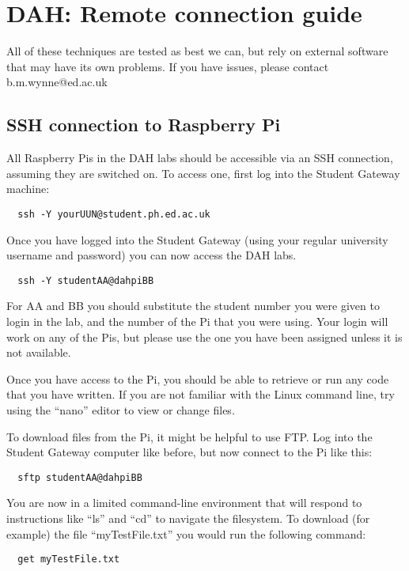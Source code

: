 \chapter{DAH: Remote connection guide}
\label{sec:remote}

All of these techniques are tested as best we can, but rely on external software that may have its own problems.
If you have issues, please contact b.m.wynne@ed.ac.uk

\section{SSH connection to Raspberry Pi}

All Raspberry Pis in the DAH labs should be accessible via an SSH connection, assuming they are switched on.
To access one, first log into the Student Gateway machine:
\begin{verbatim}
  ssh -Y yourUUN@student.ph.ed.ac.uk
\end{verbatim}

Once you have logged into the Student Gateway (using your regular university username and password) you can now access the DAH labs.
\begin{verbatim}
  ssh -Y studentAA@dahpiBB
\end{verbatim}

For AA and BB you should substitute the student number you were given to login in the lab, and the number of the Pi that you were using.
Your login will work on any of the Pis, but please use the one you have been assigned unless it is not available.

Once you have access to the Pi, you should be able to retrieve or run any code that you have written.
If you are not familiar with the Linux command line, try using the ``nano'' editor to view or change files.

\pagebreak

To download files from the Pi, it might be helpful to use FTP.
Log into the Student Gateway computer like before, but now connect to the Pi like this:
\begin{verbatim}
  sftp studentAA@dahpiBB
\end{verbatim}

You are now in a limited command-line environment that will respond to instructions like ``ls'' and ``cd'' to navigate the filesystem.
To download (for example) the file ``myTestFile.txt'' you would run the following command:
\begin{verbatim}
  get myTestFile.txt
\end{verbatim}

